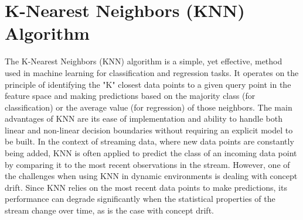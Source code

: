 \section{K-Nearest Neighbors (KNN) Algorithm}
\label{sec:knn}
The K-Nearest Neighbors \cite{zhang2022knnens} (KNN) algorithm is a simple, yet effective, method used in machine learning for classification and regression tasks. It operates on the principle of identifying the "K" closest data points to a given query point in the feature space and making predictions based on the majority class (for classification) or the average value (for regression) of those neighbors. The main advantages of KNN are its ease of implementation and ability to handle both linear and non-linear decision boundaries without requiring an explicit model to be built.
In the context of streaming data, where new data points are constantly being added, KNN is often applied to predict the class of an incoming data point by comparing it to the most recent observations in the stream. However, one of the challenges when using KNN in dynamic environments is dealing with concept drift. Since KNN relies on the most recent data points to make predictions, its performance can degrade significantly when the statistical properties of the stream change over time, as is the case with concept drift.